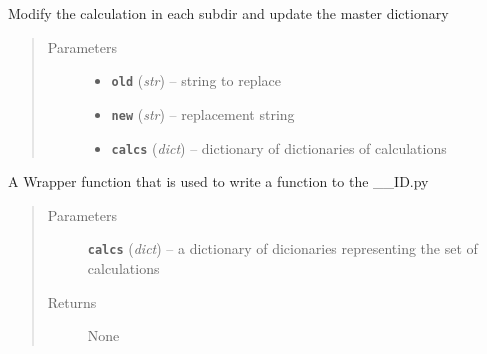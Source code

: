 \documentclass[letterpaper,10pt,english]{sphinxmanual}
\begin{document}
\begin{fulllineitems}
\label{prep:prep.modifyCalcs}
Modify the calculation in each subdir and update the master dictionary
\begin{quote}\begin{description}
\item[{Parameters}] \leavevmode\begin{itemize}
\item {} 
\textbf{\texttt{old}} (\emph{str}) -- string to replace

\item {} 
\textbf{\texttt{new}} (\emph{str}) -- replacement string

\item {} 
\textbf{\texttt{calcs}} (\emph{dict}) -- dictionary of dictionaries of calculations

\end{itemize}

\end{description}\end{quote}

\end{fulllineitems}


\begin{fulllineitems}
\label{prep:prep.modifyInputPrefixPW}
A Wrapper function that is used to write a function to the \_\_ID.py
\begin{quote}\begin{description}
\item[{Parameters}] \leavevmode
\textbf{\texttt{calcs}} (\emph{dict}) -- a dictionary of dicionaries representing the set of calculations

\item[{Returns}] \leavevmode
None

\end{description}\end{quote}

\end{fulllineitems}

\end{document}
